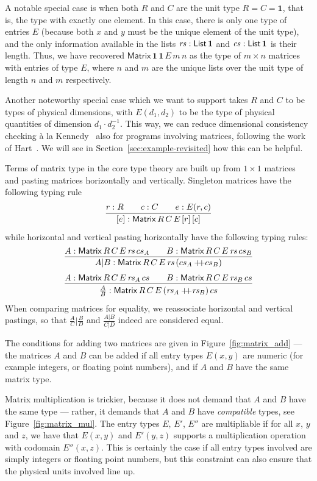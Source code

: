 \documentclass{IMEKO2024}
\newcommand{\isadd}[1]{#1\ \textsf{numeric}}
\newcommand{\ismult}[3]{(#1, #2, #3)\ \textsf{multipliable}}
\newcommand{\append}{+\!\!\!+}
\newcommand{\hjux}[2]{{#1}|{#2}}
\newcommand{\vjux}[2]{\frac{#1}{#2}}
\newcommand{\One}{\mathbf{1}}
\newcommand{\Matrix}[5]{\mathsf{Matrix}\,#1\,#2\,#3\,#4\,#5}
\newcommand{\List}[1]{\mathsf{List}\,#1}
\newcommand{\remph}{\emph}
\begin{document}
A notable special case is when both $R$ and $C$ are the unit type
$R = C = \One$, that is, the type with exactly one element.
%
In this case, there is only one type of entries $E$ (because both $x$
and $y$ must be the unique element of the unit type), and the only
information available in the lists $\rs : \List{\One}$ and
$\cs : \List{\One}$ is their length.
%
Thus, we have recovered $\Matrix{\One}{\One}{E}{m}{n}$ as the type of
$m \times n$ matrices with entries of type $E$, where $n$ and $m$ are
the unique lists over the unit type of length $n$ and $m$
respectively.

Another noteworthy special case which we want to support takes $R$ and
$C$ to be types of physical dimensions, with $E(d_1, d_2)$ to be the
type of physical quantities of dimension $d_1 \cdot d_2^{-1}$.
%
This way, we can reduce dimensional consistency checking \`a la
Kennedy~\cite{kennedyUOM} also for programs involving matrices,
following the work of Hart~\cite{hart}.
%
We will see in Section~\ref{sec:example-revisited} how this can be helpful.

Terms of matrix type in the core type theory are built up from
$1 \times 1$ matrices and pasting matrices horizontally and vertically.
%
Singleton matrices have the following typing rule
\[
  \infer{[e] : \Matrix{R}{C}{E}{[r]}{[c]}}
    {r : R
      &\quad
      c : C
      &\quad
      e : E(r, c)
    }
\]
%
while horizontal and vertical pasting horizontally have the following
typing rules:
\[
  \infer{\hjux{A}{B} : \Matrix{R}{C}{E}{\rs}{(cs_A \append cs_B)}}
  {
    A : \Matrix{R}{C}{E}{\rs}{cs_A}
    &\quad
    B : \Matrix{R}{C}{E}{\rs}{cs_B}
  }
\]
\[
  \infer{\vjux{A}{B} : \Matrix{R}{C}{E}{(\rs_A \append \rs_B)}{cs}}
  {
    A : \Matrix{R}{C}{E}{\rs_A}{cs}
    &\quad
    B : \Matrix{R}{C}{E}{\rs_B}{cs}
  }
\]
When comparing matrices for equality, we reassociate horizontal and
vertical pastings, so that $\hjux{\vjux{A}{C}}{\vjux{B}{D}}$ and
$\vjux{\hjux{A}{B}}{\hjux{C}{D}}$ indeed are considered equal.

The conditions for adding two matrices are given in Figure~\ref{fig:matrix_add} --- the matrices $A$ and $B$ can be added if all entry types $E(x, y)$ are
numeric (for example integers, or floating point numbers), and if $A$
and $B$ have the same matrix type.
%
%

Matrix multiplication is trickier, because it does not demand that $A$
and $B$ have the same type --- rather, it demands that $A$ and $B$
have \remph{compatible} types, see Figure~\ref{fig:matrix_mul}.
%
The entry types $E$, $E'$, $E''$ are multipliable if for all $x$, $y$
and $z$, we have that $E(x, y)$ and $E'(y, z)$ supports a
multiplication operation with codomain $E''(x, z)$.
%
This is certainly the case if all entry types involved are simply
integers or floating point numbers, but this constraint can also
ensure that the physical units involved line up.
\end{document}
